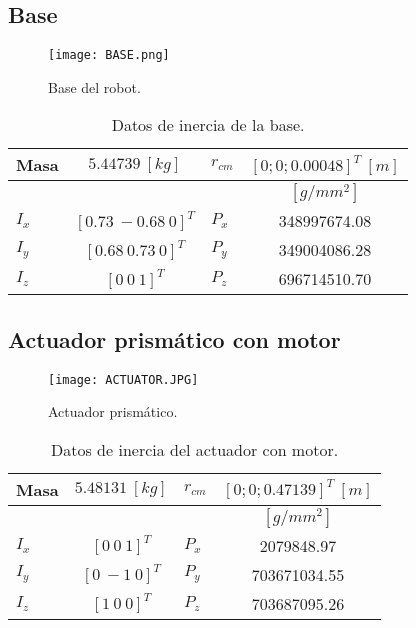 \subsection{Base}
\begin{figure}[htb!]
    \centering
    \texttt{[image: BASE.png]}
    \caption{Base del robot.}
    \label{fig: cad base}
\end{figure}
% 

\begin{table}[hb!]
 \begin{center}
\begin{tabular}{lclc}
 Masa & $ 5.44739\ [kg]$ & $r_{cm}$ &  $[0; 0; 0.00048]^T \ [m]$ \\
 \hline
 & & & $[g/mm^2]$\\
 \hline
 $ I_x $ & $ [0.73\ -0.68\ 0]^T $ & $ P_x $ & 348997674.08\\
 $ I_y $ & $ [0.68\ 0.73\ 0]^T $ & $ P_y $ & 349004086.28\\
 $ I_z $ & $ [0 \ 0 \ 1]^T $ & $ P_z $ & 696714510.70
\end{tabular}
\end{center}
\caption{Datos de inercia de la base.}
\label{tab: inertia table base}
\end{table}

\subsection{Actuador prismático con motor}

\begin{figure}[htb!]
    \centering
    \texttt{[image: ACTUATOR.JPG]}
    \caption{Actuador prismático.}
    \label{fig: cad motor}
\end{figure}

\begin{table}[hb!]
 \begin{center}
\begin{tabular}{lclc}


% 


 Masa & $ 5.48131 \ [kg]$ & $r_{cm}$ & $[0; 0; 0.47139]^T \ [m]$ \\
 \hline
 & & & $[g/mm^2]$\\
 \hline
 $ I_x $ & $ [0 \ 0 \ 1]^T $ & $ P_x $ & 2079848.97\\
 $ I_y $ & $ [0 \ -1 \ 0]^T $ & $ P_y $ & 703671034.55\\
 $ I_z $ & $ [1 \ 0 \ 0]^T $ & $ P_z $ & 703687095.26
\end{tabular}
\end{center}
\caption{Datos de inercia del actuador con motor.}
\label{tab: inertia table motor}
\end{table}

